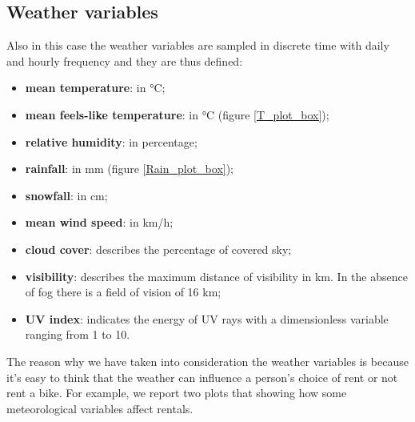 \subsection{Weather variables}
Also in this case the weather variables are sampled in discrete time with daily and hourly frequency and they are thus defined:
\begin{itemize}
	\item \textbf{mean temperature}: in \unit{\degreeCelsius};
	\item \textbf{mean feels-like temperature}: in \unit{\degreeCelsius} (figure \ref{T_plot_box});
	\item \textbf{relative humidity}: in percentage;
	\item \textbf{rainfall}: in \unit{\milli\meter} (figure \ref{Rain_plot_box});
	\item \textbf{snowfall}: in \unit{\centi\meter};
	\item \textbf{mean wind speed}: in \unit{\kilo\meter/\hour};
	\item \textbf{cloud cover}: describes the percentage of covered sky;
	\item \textbf{visibility}: describes the maximum distance of visibility in \unit{\kilo\meter}. In the absence of fog there is a field of vision of \num{16} km;
	\item \textbf{UV index}: indicates the energy of UV rays with a dimensionless variable ranging from \num{1} to \num{10}.
\end{itemize}
The reason why we have taken into consideration the weather variables is because it's easy to think that the weather can influence a person's choice of rent or not rent a bike. For example, we report two plots that showing how some meteorological variables affect rentals.

